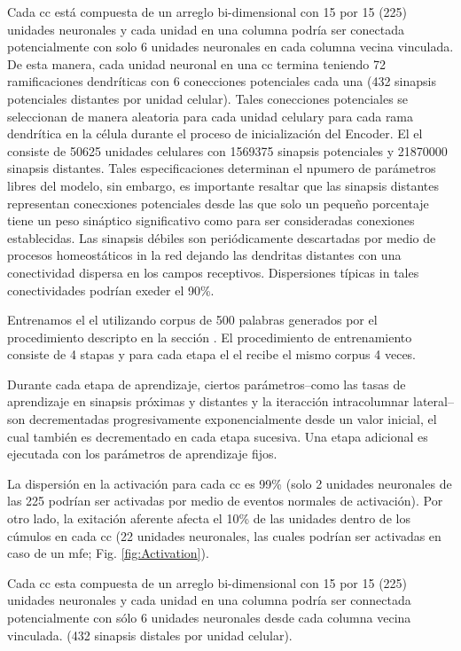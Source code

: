 Cada \gls{cc} está compuesta de un arreglo bi-dimensional con 15 por 15 (225) unidades neuronales y cada unidad en una columna podría ser conectada potencialmente con solo 6 unidades neuronales en cada columna vecina vinculada.
De esta manera, cada unidad neuronal en una \gls{cc} termina teniendo 72 ramificaciones dendríticas con 6 conecciones potenciales cada una (432 sinapsis potenciales distantes por unidad celular).
Tales conecciones potenciales se seleccionan de manera aleatoria para cada unidad celulary para cada rama dendrítica en la célula durante el proceso de inicialización del Encoder. El \gls{el} consiste de 50625 unidades celulares con 1569375 sinapsis potenciales y 21870000 sinapsis distantes.
Tales especificaciones determinan el npumero de parámetros libres del modelo, sin embargo, es importante resaltar que las sinapsis distantes representan conecxiones potenciales desde las que solo un pequeño porcentaje tiene un peso sináptico significativo como para ser consideradas conexiones establecidas.
Las sinapsis débiles son periódicamente descartadas por medio de procesos homeostáticos in la red dejando las dendritas distantes con una conectividad dispersa en los campos receptivos. Dispersiones típicas in tales conectividades podrían exeder el 90\%.

Entrenamos el \gls{el} utilizando corpus de 500 palabras generados por el procedimiento descripto en la sección .
El procedimiento de entrenamiento consiste de 4 stapas y para cada etapa el \gls{el} recibe el mismo corpus 4 veces.

Durante cada etapa de aprendizaje, ciertos parámetros--como las tasas de aprendizaje en sinapsis próximas y distantes y la iteracción intracolumnar lateral--son decrementadas progresivamente exponencialmente desde un valor inicial, el cual también es decrementado en cada etapa sucesiva.
Una etapa adicional es ejecutada con los parámetros de aprendizaje fijos.

La dispersión en la activación para cada \gls{cc} es 99\% (solo 2 unidades neuronales de las 225 podrían ser activadas por medio de eventos normales de activación).
Por otro lado, la exitación aferente afecta el 10\% de las unidades dentro de los cúmulos en cada \gls{cc}
(22 unidades neuronales, las cuales podrían ser activadas en caso de un \gls{mfe}; Fig. \ref{fig:Activation}).

Cada \gls{cc} esta compuesta de un arreglo bi-dimensional con 15 por 15 (225) unidades neuronales y
cada unidad en una columna podría ser connectada potencialmente con sólo 6 unidades neuronales desde cada columna vecina vinculada.
(432 sinapsis distales por unidad celular).


